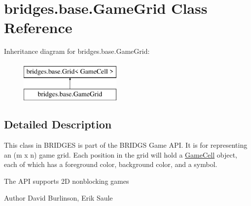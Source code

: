 \hypertarget{classbridges_1_1base_1_1_game_grid}{}\section{bridges.\+base.\+Game\+Grid Class Reference}
\label{classbridges_1_1base_1_1_game_grid}
Inheritance diagram for bridges.\+base.\+Game\+Grid\+:\begin{figure}[H]
\begin{center}
\leavevmode
\includegraphics[height=2.000000cm]{classbridges_1_1base_1_1_game_grid}
\end{center}
\end{figure}


\subsection{Detailed Description}
This class in B\+R\+I\+D\+G\+ES is part of the B\+R\+I\+D\+GS Game A\+PI. It is for representing an (m x n) game grid. Each position in the grid will hold a \hyperlink{classbridges_1_1base_1_1_game_cell}{Game\+Cell} object, each of which has a foreground color, background color, and a symbol. 

The A\+PI supports 2D nonblocking games

\begin{DoxyAuthor}{Author}
David Burlinson, Erik Saule 
\end{DoxyAuthor}
